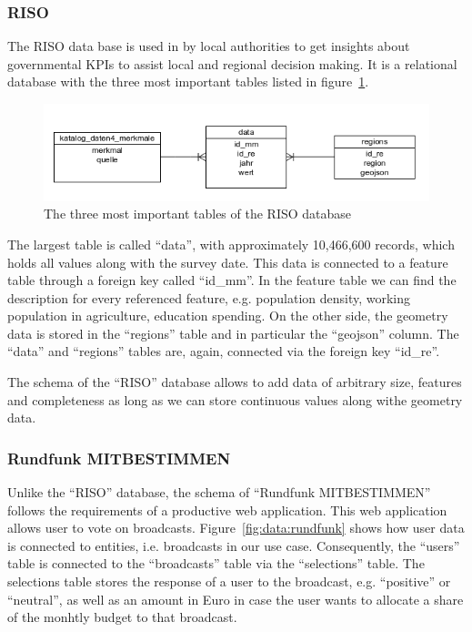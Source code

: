 \documentclass{article}
\begin{document}

\subsubsection{RISO}

The RISO data base is used in by local authorities to get insights about governmental KPIs to assist local and regional decision making.
It is a relational database with the three most important tables listed in figure~\ref{fig:data:riso}.
\begin{figure}[h]
\centering
  \includegraphics[width=\textwidth]{images/riso}
  \caption{The three most important tables of the RISO database}
  \label{fig:data:riso}
\end{figure}

The largest table is called ``data'', with approximately 10,466,600 records, which holds all values along with the survey date.
This data is connected to a feature table through a foreign key called ``id\_mm''.
In the feature table we can find the description for every referenced feature, e.g. population density, working population in agriculture, education spending.
On the other side, the geometry data is stored in the ``regions'' table and in particular the ``geojson'' column.
The ``data'' and ``regions'' tables are, again, connected via the foreign key ``id\_re''.

The schema of the ``RISO'' database allows to add data of arbitrary size, features and completeness as long as we can store continuous values along withe geometry data.


\subsubsection{Rundfunk MITBESTIMMEN}
Unlike the ``RISO'' database, the schema of ``Rundfunk MITBESTIMMEN'' follows the requirements of a productive web application.
This web application allows user to vote on broadcasts.
Figure~\ref{fig:data:rundfunk} shows how user data is connected to entities, i.e. broadcasts in our use case.
Consequently, the ``users'' table is connected to the ``broadcasts'' table via the ``selections'' table.
The selections table stores the response of a user to the broadcast, e.g. ``positive'' or ``neutral'', as well as an amount in Euro in case the user wants to allocate a share of the monhtly budget to that broadcast.
\end{document}
